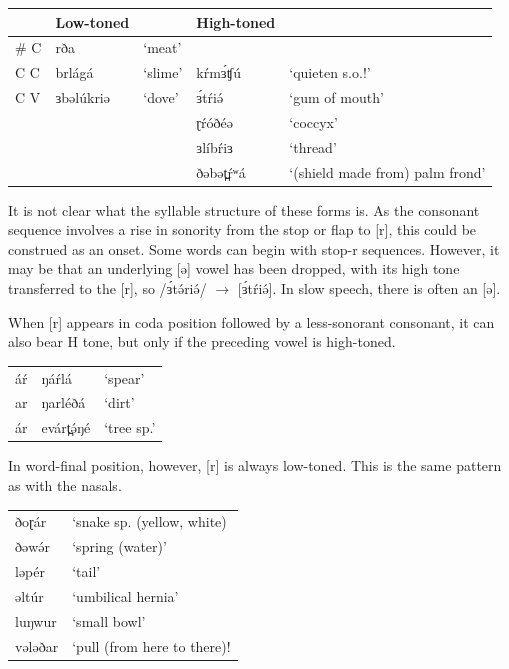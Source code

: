 \ea
\begin{tabular}[t]{llllp{3.25cm}}
 & Low-toned & & High-toned\\
\midrule
\# \underline{\hspace{0.3cm}} C &	rða		&	‘meat’\\
C \underline{\hspace{0.3cm}} C 	&	brlágá	&	‘slime’		&	kŕmɜ́ʧú	&	‘quieten s.o.!’\\
C \underline{\hspace{0.3cm}} V	&	ɜbəlúkriə	&	‘dove’	&	ɜ́tŕiə́	&	‘gum of mouth’\\

&&&ɽŕóðéə	&	‘coccyx’\\
&&&ɜlíbŕiɜ	&	‘thread’\\
&&&ðəbət̪ŕʷá	&	‘(shield made from) palm frond’\\
\end{tabular}
\z

It is not clear what the syllable structure of these forms is. As the consonant sequence involves a rise in sonority from the stop or flap to [r], this could be construed as an onset. Some words can begin with stop-r sequences. However, it may be that an underlying [ə] vowel has been dropped, with its high tone transferred to the [r], so /ɜ́tə́riə́/  $\rightarrow$ [ɜ́tŕiə́]. In slow speech, there is often an [ə].

When [r] appears in coda position followed by a less-sonorant consonant, it can also bear H tone, but only if the preceding vowel is high-toned. 

\ea
\begin{tabular}[t]{lll}
áŕ	&	ŋáŕlá	&	‘spear’	\\
ar	&	ŋarléðá	&	‘dirt’	\\
ár	&	evárt̪ə́ŋé	&	‘tree sp.’\\
\end{tabular}
\z

In word-final position, however, [r] is always low-toned. This is the same pattern as with the nasals. 

\ea
\begin{tabular}[t]{ll}
ðoɽár		&	‘snake sp. (yellow, white)\\
ðəwə́r		&	‘spring (water)’\\
ləpér		&	‘tail’\\
əltúr		&	‘umbilical hernia’\\
luŋwur		&	‘small bowl’\\
vələðar		&	‘pull (from here to there)!\\
\end{tabular}
\z

